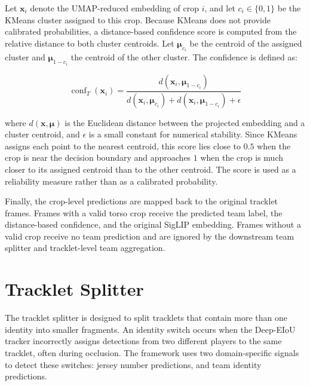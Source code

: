 Let $\mathbf{x}_i$ denote the UMAP-reduced embedding of crop $i$, and let $c_i \in \{0,1\}$ be the KMeans cluster assigned to this crop. Because KMeans does not provide calibrated probabilities, a distance-based confidence score is computed from the relative distance to both cluster centroids. Let $\boldsymbol{\mu}_{c_i}$ be the centroid of the assigned cluster and $\boldsymbol{\mu}_{1-c_i}$ the centroid of the other cluster. The confidence is defined as:

\begin{equation}\label{eq:team_conf}
    \operatorname{conf}_T(\mathbf{x}_i)=
    \frac{d(\mathbf{x}_i,\boldsymbol{\mu}_{1-c_i})}
    {d(\mathbf{x}_i,\boldsymbol{\mu}_{c_i}) + d(\mathbf{x}_i,\boldsymbol{\mu}_{1-c_i}) + \epsilon}
\end{equation}

where $d(\mathbf{x}, \boldsymbol{\mu})$ is the Euclidean distance between the projected embedding and a cluster centroid, and $\epsilon$ is a small constant for numerical stability. Since KMeans assigns each point to the nearest centroid, this score lies close to $0.5$ when the crop is near the decision boundary and approaches $1$ when the crop is much closer to its assigned centroid than to the other centroid. The score is used as a reliability measure rather than as a calibrated probability.

Finally, the crop-level predictions are mapped back to the original tracklet frames. Frames with a valid torso crop receive the predicted team label, the distance-based confidence, and the original SigLIP embedding. Frames without a valid crop receive no team prediction and are ignored by the downstream team splitter and tracklet-level team aggregation.



\section{Tracklet Splitter}\label{tracklet_splitter}
The tracklet splitter is designed to split tracklets that contain more than one identity into smaller fragments. An identity switch occurs when the Deep-EIoU tracker incorrectly assigns detections from two different players to the same tracklet, often during occlusion. The framework uses two domain-specific signals to detect these switches: jersey number predictions, and team identity predictions. 

\

